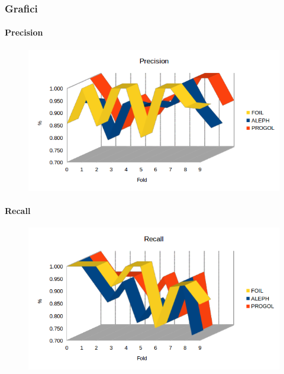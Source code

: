 \subsubsection{Grafici}
\paragraph{Precision}
\begin{figure}[hbtp]
	\includegraphics[width=1.2\textwidth]{img/datasetGraph/mlj/discr/precision.png}
	\label{mljdiscr-Precision}
\end{figure}
\paragraph{Recall}
\begin{figure}[hbtp]
	\includegraphics[width=1.2\textwidth]{img/datasetGraph/mlj/discr/recall.png}
	\label{mljdiscr-Recall}
\end{figure}
